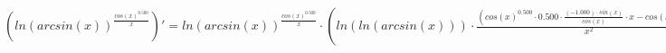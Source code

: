 \documentclass[a4paper,12pt]{article}
\begin{document}
\begin{math}
	( ln ( arcsin (x) )  ^{ \frac{ cos (x)  ^{0.500} }{x} } )' =  ln ( arcsin (x) )  ^{ \frac{ cos (x)  ^{0.500} }{x} }  \cdot ( ln ( ln ( arcsin (x) ) )  \cdot  \frac{( cos (x)  ^{0.500}  \cdot 0.500 \cdot  \frac{(-1.000) \cdot  sin (x) }{ cos (x) }  \cdot x -  cos (x)  ^{0.500} )}{x ^{2} }  +  \frac{ \frac{1}{ arcsin (x) }  \cdot  \frac{1}{(1 - x ^{2} ) ^{0.500} } }{ ln ( arcsin (x) ) }  \cdot  \frac{ cos (x)  ^{0.500} }{x} )\end{math}
\end{document}
